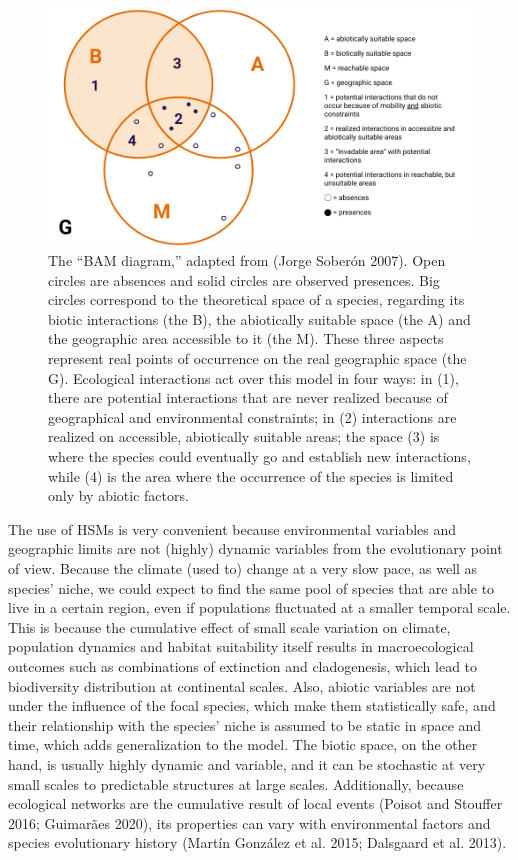 \documentclass[12pt]{article}
\makeatletter
\def\maxwidth{\ifdim\Gin@nat@width>\linewidth\linewidth
\else\Gin@nat@width\fi}
\let\Oldincludegraphics\includegraphics
\renewcommand{\includegraphics}[1]{\Oldincludegraphics[width=\maxwidth]{#1}}
\makeatother
\begin{document}
\begin{figure}
\hypertarget{fig:bam}{%
\centering
\includegraphics{figures/bam.png}
\caption{The ``BAM diagram,'' adapted from (Jorge Soberón 2007). Open
circles are absences and solid circles are observed presences. Big
circles correspond to the theoretical space of a species, regarding its
biotic interactions (the B), the abiotically suitable space (the A) and
the geographic area accessible to it (the M). These three aspects
represent real points of occurrence on the real geographic space (the
G). Ecological interactions act over this model in four ways: in (1),
there are potential interactions that are never realized because of
geographical and environmental constraints; in (2) interactions are
realized on accessible, abiotically suitable areas; the space (3) is
where the species could eventually go and establish new interactions,
while (4) is the area where the occurrence of the species is limited
only by abiotic factors.}\label{fig:bam}
}
\end{figure}

The use of HSMs is very convenient because environmental variables and
geographic limits are not (highly) dynamic variables from the
evolutionary point of view. Because the climate (used to) change at a
very slow pace, as well as species' niche, we could expect to find the
same pool of species that are able to live in a certain region, even if
populations fluctuated at a smaller temporal scale. This is because the
cumulative effect of small scale variation on climate, population
dynamics and habitat suitability itself results in macroecological
outcomes such as combinations of extinction and cladogenesis, which lead
to biodiversity distribution at continental scales. Also, abiotic
variables are not under the influence of the focal species, which make
them statistically safe, and their relationship with the species' niche
is assumed to be static in space and time, which adds generalization to
the model. The biotic space, on the other hand, is usually highly
dynamic and variable, and it can be stochastic at very small scales to
predictable structures at large scales. Additionally, because ecological
networks are the cumulative result of local events (Poisot and Stouffer
2016; Guimarães 2020), its properties can vary with environmental
factors and species evolutionary history (Martín González et al. 2015;
Dalsgaard et al. 2013).
\end{document}
